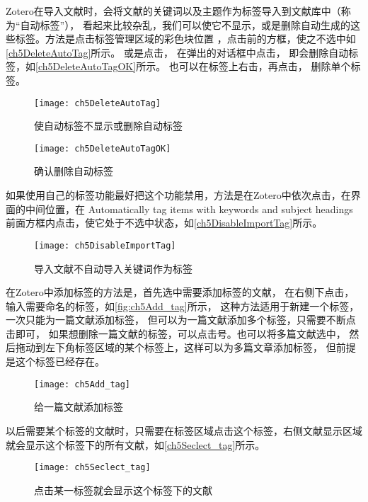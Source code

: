 \documentclass[cn,11pt,chinese]{elegantbook}
\begin{document}
			Zotero在导入文献时，会将文献的关键词以及主题作为标签导入到文献库中（称为“自动标签”），
			看起来比较杂乱，我们可以使它不显示，或是删除自动生成的这些标签。方法是点击标签管理区域的彩色块位置
			，点击前的方框，使之不选中如\autoref{ch5DeleteAutoTag}所示。
			或是点击，
			在弹出的对话框中点击，
			即会删除自动标签，如\autoref{ch5DeleteAutoTagOK}所示。
			也可以在标签上右击，再点击，
			删除单个标签。
			
				\begin{figure}[htbp]
					\centering
					\texttt{[image: ch5DeleteAutoTag]}
					\caption{使自动标签不显示或删除自动标签}
					\label{ch5DeleteAutoTag}
				\end{figure}
				\begin{figure}[htbp]
					\centering
					\texttt{[image: ch5DeleteAutoTagOK]}
					\caption{确认删除自动标签}
					\label{ch5DeleteAutoTagOK}
				\end{figure}
			
			如果使用自己的标签功能最好把这个功能禁用，方法是在Zotero中依次点击，在界面的中间位置，在
			Automatically tag items with keywords and subject headings前面方框内点击，使它处于不选中状态，如\autoref{ch5DisableImportTag}所示。
				\begin{figure}[htbp]
					\centering
					\texttt{[image: ch5DisableImportTag]}
					\caption{导入文献不自动导入关键词作为标签}
					\label{ch5DisableImportTag}
				\end{figure}
						
			在Zotero中添加标签的方法是，首先选中需要添加标签的文献，
			在右侧下点击，
			输入需要命名的标签，如\autoref{fig:ch5Add_tag}所示，
			这种方法适用于新建一个标签，一次只能为一篇文献添加标签，
			但可以为一篇文献添加多个标签，只需要不断点击即可，
			如果想删除一篇文献的标签，可以点击\menu[,]{-}号。也可以将多篇文献选中，
			然后拖动到左下角标签区域的某个标签上，这样可以为多篇文章添加标签，
			但前提是这个标签已经存在。
				\begin{figure}[htbp]
					\centering
					\texttt{[image: ch5Add\_tag]}
					\caption{给一篇文献添加标签}
					\label{fig:ch5Add_tag}
				\end{figure}
			
			以后需要某个标签的文献时，只需要在标签区域点击这个标签，右侧文献显示区域就会显示这个标签下的所有文献，如\autoref{ch5Seclect_tag}所示。
				\begin{figure}[htbp]
					\centering
					\texttt{[image: ch5Seclect\_tag]}
					\caption{点击某一标签就会显示这个标签下的文献}
					\label{ch5Seclect_tag}
				\end{figure}
			
\end{document}
